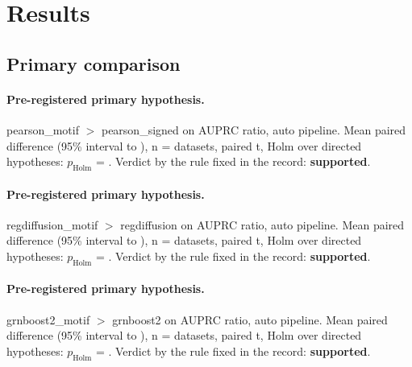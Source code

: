 \documentclass{article}
\begin{document}
\section{Results}
\subsection{Primary comparison}
\paragraph{Pre-registered primary hypothesis.} pearson\_motif $>$ pearson\_signed on AUPRC ratio, auto pipeline. Mean paired difference \gbDiffAuprcRatioAutoPearsonMotifVsPearsonSigned{} (95\% interval \gbCiLowAuprcRatioAutoPearsonMotifVsPearsonSigned{} to \gbCiHighAuprcRatioAutoPearsonMotifVsPearsonSigned{}), n = \gbNAuprcRatioAutoPearsonMotifVsPearsonSigned{} datasets, paired t, Holm over \gbFamilyAuprcRatioAuto{} directed hypotheses: $p_{\mathrm{Holm}}$ = \gbPHolmAuprcRatioAutoPearsonMotifVsPearsonSigned{}. Verdict by the rule fixed in the record: \textbf{supported}.
\paragraph{Pre-registered primary hypothesis.} regdiffusion\_motif $>$ regdiffusion on AUPRC ratio, auto pipeline. Mean paired difference \gbDiffAuprcRatioAutoRegdiffusionMotifVsRegdiffusion{} (95\% interval \gbCiLowAuprcRatioAutoRegdiffusionMotifVsRegdiffusion{} to \gbCiHighAuprcRatioAutoRegdiffusionMotifVsRegdiffusion{}), n = \gbNAuprcRatioAutoRegdiffusionMotifVsRegdiffusion{} datasets, paired t, Holm over \gbFamilyAuprcRatioAuto{} directed hypotheses: $p_{\mathrm{Holm}}$ = \gbPHolmAuprcRatioAutoRegdiffusionMotifVsRegdiffusion{}. Verdict by the rule fixed in the record: \textbf{supported}.
\paragraph{Pre-registered primary hypothesis.} grnboost2\_motif $>$ grnboost2 on AUPRC ratio, auto pipeline. Mean paired difference \gbDiffAuprcRatioAutoGrnboostTwoMotifVsGrnboostTwo{} (95\% interval \gbCiLowAuprcRatioAutoGrnboostTwoMotifVsGrnboostTwo{} to \gbCiHighAuprcRatioAutoGrnboostTwoMotifVsGrnboostTwo{}), n = \gbNAuprcRatioAutoGrnboostTwoMotifVsGrnboostTwo{} datasets, paired t, Holm over \gbFamilyAuprcRatioAuto{} directed hypotheses: $p_{\mathrm{Holm}}$ = \gbPHolmAuprcRatioAutoGrnboostTwoMotifVsGrnboostTwo{}. Verdict by the rule fixed in the record: \textbf{supported}.
\end{document}
